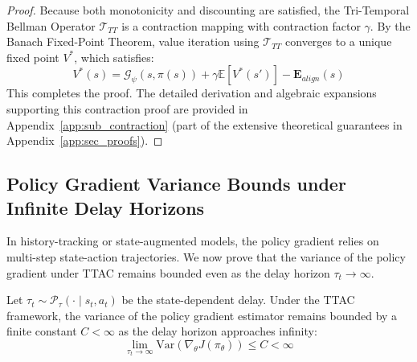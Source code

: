 \documentclass[manuscript, screen, review]{jair}
\begin{document}
\begin{proof}
Because both monotonicity and discounting are satisfied, the Tri-Temporal Bellman Operator $\mathcal{T}_{TT}$ is a contraction mapping with contraction factor $\gamma$. By the Banach Fixed-Point Theorem, value iteration using $\mathcal{T}_{TT}$ converges to a unique fixed point $V^*$, which satisfies:
\begin{equation*}
    V^*(s) = \mathcal{G}_\psi(s, \pi(s)) + \gamma \mathbb{E} [V^*(s')] - \mathbf{E}_{align}(s)
\end{equation*}
This completes the proof. The detailed derivation and algebraic expansions supporting this contraction proof are provided in Appendix~\ref{app:sub_contraction} (part of the extensive theoretical guarantees in Appendix~\ref{app:sec_proofs}).
\end{proof}

\subsection{Policy Gradient Variance Bounds under Infinite Delay Horizons}
In history-tracking or state-augmented models, the policy gradient relies on multi-step state-action trajectories. We now prove that the variance of the policy gradient under TTAC remains bounded even as the delay horizon $\tau_t \to \infty$.

\begin{theorem}\label{thm:variance_bounding}
Let $\tau_t \sim \mathcal{P}_\tau(\cdot \mid s_t, a_t)$ be the state-dependent delay. Under the TTAC framework, the variance of the policy gradient estimator remains bounded by a finite constant $C < \infty$ as the delay horizon approaches infinity:
\begin{equation}
    \left. \lim_{\tau_t \to \infty} \text{Var}(\nabla_\theta J(\pi_\theta)) \le C < \infty \right.
\end{equation}
\end{theorem}
\end{document}
